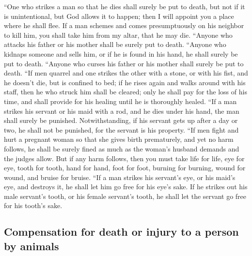  ``One who strikes a man so that he dies shall surely be
put to death,  but not if it is unintentional, but God
allows it to happen; then I will appoint you a place where he shall
flee.  If a man schemes and comes presumptuously on his
neighbor to kill him, you shall take him from my altar, that he may die.
 ``Anyone who attacks his father or his mother shall be
surely put to death.  ``Anyone who kidnaps someone and
sells him, or if he is found in his hand, he shall surely be put to
death.  ``Anyone who curses his father or his mother
shall surely be put to death.  ``If men quarrel and one
strikes the other with a stone, or with his fist, and he doesn't die,
but is confined to bed;  if he rises again and walks
around with his staff, then he who struck him shall be cleared; only he
shall pay for the loss of his time, and shall provide for his healing
until he is thoroughly healed.  ``If a man strikes his
servant or his maid with a rod, and he dies under his hand, the man
shall surely be punished.  Notwithstanding, if his
servant gets up after a day or two, he shall not be punished, for the
servant is his property.  ``If men fight and hurt a
pregnant woman so that she gives birth prematurely, and yet no harm
follows, he shall be surely fined as much as the woman's husband demands
and the judges allow.  But if any harm follows, then you
must take life for life,  eye for eye, tooth for tooth,
hand for hand, foot for foot,  burning for burning, wound
for wound, and bruise for bruise.  ``If a man strikes his
servant's eye, or his maid's eye, and destroys it, he shall let him go
free for his eye's sake.  If he strikes out his male
servant's tooth, or his female servant's tooth, he shall let the servant
go free for his tooth's sake.

\hypertarget{compensation-for-death-or-injury-to-a-person-by-animals}{%
\subsection{Compensation for death or injury to a person by
animals}\label{compensation-for-death-or-injury-to-a-person-by-animals}}

